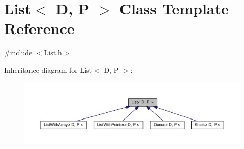 \hypertarget{classList}{}\section{List$<$ D, P $>$ Class Template Reference}
\label{classList}


{\ttfamily \#include $<$List.\+h$>$}



Inheritance diagram for List$<$ D, P $>$\+:
\nopagebreak
\begin{figure}[H]
\begin{center}
\leavevmode
\includegraphics[width=350pt]{classList__inherit__graph}
\end{center}
\end{figure}
